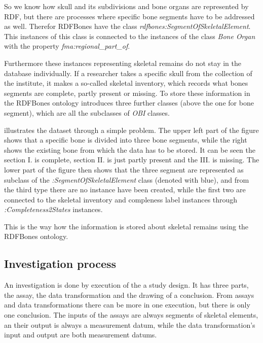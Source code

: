 So we know how skull and its subdivisions and bone organs are represented by RDF, but there are processes where specific bone segments have to be addressed as well. Therefor RDFBones have the class \textit{rdfbones:SegmentOfSkeletalElement}. This instances of this class is connected to the instances of the class \textit{Bone Organ} with the property \textit{fma:regional\_part\_of}.


Furthermore these instances representing skeletal remains do not stay in the database individually. If a researcher takes a specific skull from the collection of the institute, it makes a so-called skeletal inventory, which records what bones segments are complete, partly present or missing. To store these information in the RDFBones ontology introduces three further classes (above the one for bone segment), which are all the subclasses of \textit{OBI} classes. 



 illustrates the dataset through a simple problem. The upper left part of the figure shows that a specific bone is divided into three bone segments, while the right shows the existing bone from which the data has to be stored. It can be seen the section I. is complete, section II. is just partly present and the III. is missing. The lower part of the figure then shows that the three segment are represented as subclass of the \textit{:SegmentOfSkeletalElement} class (denoted with blue), and from the third type there are no instance have been created, while the first two are connected to the skeletal inventory and compleness label instances through \textit{:Completeness2States} instances. 



This is the way how the information is stored about skeletal remains using the RDFBones ontology.


\subsection{Investigation process}\label{332}


An investigation is done by execution of the a study design. It has three parts, the assay, the data transformation and the drawing of a conclusion. From assays and data transformations there can be more in one execution, but there is only one conclusion. The inputs of the assays are always segments of skeletal elements, an their output is always a measurement datum, while the data transformation's  input and output are both measurement datums.


